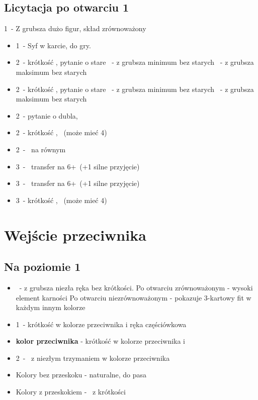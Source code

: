\documentclass[12pt, a4paper]{article}
\begin{document}
\subsection{Licytacja po otwarciu 1\spades}
\begin{formal}
    1\spades\ - Z grubsza dużo figur, skład zrównoważony
\end{formal}
\begin{itemize}
    \item 1\nt\ - Syf w karcie, do gry.
    \item 2\clubs\ - krótkość \clubs, pytanie o stare
    \diams\ - z grubsza minimum bez starych
    \nt\ - z grubsza maksimum bez starych
    \item 2\diams\ - krótkość \diams, pytanie o stare
    \nt\ - z grubsza minimum bez starych
    \clubs\ - z grubsza maksimum bez starych
    \item 2\hearts\ - pytanie o dubla, \gf
    \item 2\spades\ - krótkość \spades, \gf\ (może mieć 4\hearts)
    \item 2\nt\ - \gf\ na równym
    \item 3\clubs\ - \gf\ transfer na 6+\hearts\ (+1 silne przyjęcie)
    \item 3\diams\ - \gf\ transfer na 6+\spades\ (+1 silne przyjęcie)
    \item 3\hearts\ - krótkość \hearts, \gf\ (może mieć 4\spades)
\end{itemize}

\pagebreak
\section{Wejście przeciwnika}
\subsection{Na poziomie 1}
\begin{itemize}
    \item \dbl\ - z grubsza niezła ręka bez krótkości.
    \subitem Po otwarciu zrównoważonym - wysoki element karności
    \subitem Po otwarciu niezrównoważonym - pokazuje 3-kartowy fit w każdym innym kolorze
    \item 1\nt\ - krótkość w kolorze przeciwnika i ręka częściówkowa
    \item \textbf{kolor przeciwnika} - krótkość w kolorze przeciwnika i \gf
    \item 2\nt\ - \gf\ z niezłym trzymaniem w kolorze przeciwnika
    \item Kolory bez przeskoku - naturalne, do pasa
    \item Kolory z przeskokiem - \gf\ z krótkości
\end{itemize}
\end{document}
